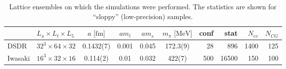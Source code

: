\documentclass{PoS}
\begin{document}
\begin{table}[ht!]
\caption{Lattice ensembles on which the simulations were performed. 
  The statistics are shown for ``sloppy'' (low-precision) samples.
  \label{tab:ens}}
\begin{tabular}{ll|cccc|rrrr}
\hline\hline
 & $L_x\times L_t\times L_5$ 
  & $a\text{ [fm]}$ & $am_l$ & $am_s$ &  $m_\pi\text{ [MeV]}$ 
  & conf & stat & $N_{ev}$ & $N_{CG}$ \\
\hline
DSDR & $32^3\times64\times32$ & 
  0.1432(7) & 0.001 & 0.045 & 172.3(9) & 28 & 896 & 1400 & 125 \\
Iwasaki & $16^3\times32\times16$ &  
  0.114(2) & 0.01 & 0.032 & 422(7) & 500 & 16500 & 150 & 100 \\
\hline\hline
\end{tabular}
\end{table}
\end{document}
